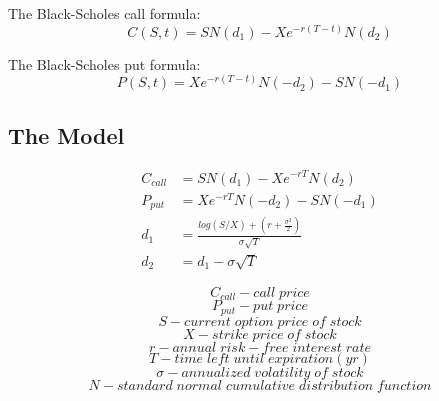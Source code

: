 The Black-Scholes call formula:
\[C(S,t) = SN(d_1) - Xe^{-r(T-t)}N(d_2)\]



The Black-Scholes put formula:
\[P(S,t) = Xe^{-r(T-t)}N(-d_2)-SN(-d_1)\]


\subsection{The Model}

\begin{align*}
C_{call} &= SN(d_1) - Xe^{-rT}N(d_2) \\
P_{put} &= Xe^{-rT}N(-d_2) - SN(-d_1) \\ 
d_1 &= \frac{log(S/X) + (r + \frac{\sigma^2}{2})}{\sigma\sqrt{T}} \\
d_2 &= d_1 - \sigma\sqrt{T}
\end{align*}


$$C_{call} - call\; price$$
$$P_{put} - put\; price$$
$$S - current\; option\; price\; of \;stock $$
$$X - strike\; price\; of\; stock$$ 
$$r - annual\; risk-free\; interest\; rate$$
$$T - time\; left\; until\; expiration (yr)$$
$$\sigma - annualized\; volatility\; of\; stock$$ 
$$N - standard\; normal\; cumulative\; distribution\; function$$
















%